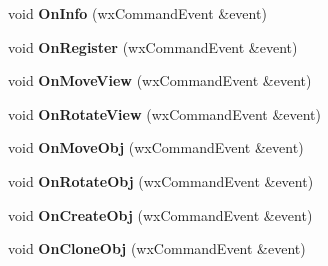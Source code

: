 \begin{DoxyCompactItemize}
\item 
\hypertarget{classgui_parent_window_afdf2ac0b8164215b1450f4d4f8ccc855}{
void {\bfseries OnInfo} (wxCommandEvent \&event)}
\label{classgui_parent_window_afdf2ac0b8164215b1450f4d4f8ccc855}

\item 
\hypertarget{classgui_parent_window_acfb9b46644002917fbf0bc680a0c5b79}{
void {\bfseries OnRegister} (wxCommandEvent \&event)}
\label{classgui_parent_window_acfb9b46644002917fbf0bc680a0c5b79}

\item 
\hypertarget{classgui_parent_window_a74bbd975831ab942790c696e38028ca0}{
void {\bfseries OnMoveView} (wxCommandEvent \&event)}
\label{classgui_parent_window_a74bbd975831ab942790c696e38028ca0}

\item 
\hypertarget{classgui_parent_window_a2684cf389a9f7dc1f0ca210813fc5f3d}{
void {\bfseries OnRotateView} (wxCommandEvent \&event)}
\label{classgui_parent_window_a2684cf389a9f7dc1f0ca210813fc5f3d}

\item 
\hypertarget{classgui_parent_window_a52a1f958ee061453955b80f74dbfa867}{
void {\bfseries OnMoveObj} (wxCommandEvent \&event)}
\label{classgui_parent_window_a52a1f958ee061453955b80f74dbfa867}

\item 
\hypertarget{classgui_parent_window_a0d70c3b1e2e2189de1e69faf254a6b70}{
void {\bfseries OnRotateObj} (wxCommandEvent \&event)}
\label{classgui_parent_window_a0d70c3b1e2e2189de1e69faf254a6b70}

\item 
\hypertarget{classgui_parent_window_a5a8e1c85208eb855cffc37c4bf400c20}{
void {\bfseries OnCreateObj} (wxCommandEvent \&event)}
\label{classgui_parent_window_a5a8e1c85208eb855cffc37c4bf400c20}

\item 
\hypertarget{classgui_parent_window_ab7bdb4f08cde2a260770d83072ab407e}{
void {\bfseries OnCloneObj} (wxCommandEvent \&event)}
\label{classgui_parent_window_ab7bdb4f08cde2a260770d83072ab407e}

\end{DoxyCompactItemize}
